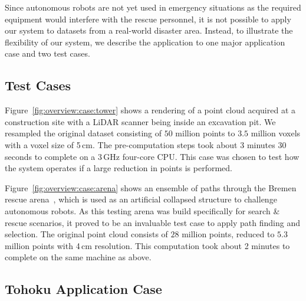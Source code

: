 \documentclass[conference,10pt,letter]{IEEEtran}
\begin{document}
Since autonomous robots are not yet used in emergency situations as the required equipment would interfere with the rescue personnel, it is not possible to apply our system to datasets from a real-world disaster area. Instead, to illustrate the flexibility of our system, we describe the application to one major application case and two test cases.

\subsection{Test Cases} \label{sec:results:testcases}
 Figure~\ref{fig:overview:case:tower} shows a rendering of a point cloud acquired at a construction site with a LiDAR scanner being inside an excavation pit. We resampled the original dataset consisting of $50$ million points to $3.5$ million voxels with a voxel size of 5\,cm. The pre-computation steps took about 3 minutes 30 seconds to complete on a 3\,GHz four-core CPU. This case was chosen to test how the system operates if a large reduction in points is performed.

 Figure~\ref{fig:overview:case:arena} shows an ensemble of paths through the Bremen rescue arena~\cite{varsadan08}, which is used as an artificial collapsed structure to challenge autonomous robots. As this testing arena was build specifically for search \& rescue scenarios, it proved to be an invaluable test case to apply path finding and selection. The original point cloud consists of $28$ million points, reduced to $5.3$ million points with 4\,cm resolution. This computation took about 2 minutes to complete on the same machine as above.

\subsection{Tohoku Application Case} \label{sec:results:applicationcase}
\end{document}
